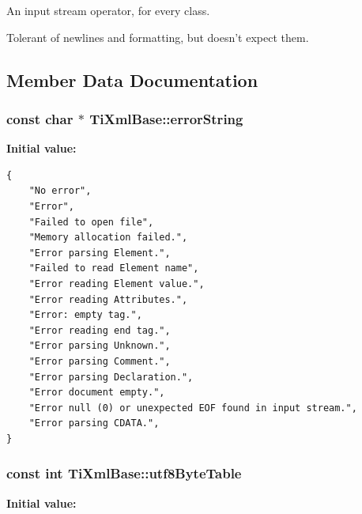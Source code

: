 An input stream operator, for every class. 

Tolerant of newlines and formatting, but doesn't expect them.

\subsection{Member Data Documentation}
\subsubsection{\setlength{\rightskip}{0pt plus 5cm}const char $\ast$ Ti\-Xml\-Base::error\-String\hspace{0.3cm}{\tt  [static, protected, inherited]}}\label{classTiXmlBase_TiXmlUnknownt0}


{\bf Initial value:}

\footnotesize\begin{verbatim}
{
    "No error",
    "Error",
    "Failed to open file",
    "Memory allocation failed.",
    "Error parsing Element.",
    "Failed to read Element name",
    "Error reading Element value.",
    "Error reading Attributes.",
    "Error: empty tag.",
    "Error reading end tag.",
    "Error parsing Unknown.",
    "Error parsing Comment.",
    "Error parsing Declaration.",
    "Error document empty.",
    "Error null (0) or unexpected EOF found in input stream.",
    "Error parsing CDATA.",
}
\end{verbatim}\normalsize 
{}
\subsubsection{\setlength{\rightskip}{0pt plus 5cm}const int Ti\-Xml\-Base::utf8Byte\-Table\hspace{0.3cm}{\tt  [static, inherited]}}\label{classTiXmlBase_TiXmlUnknowns0}


{\bf Initial value:}

